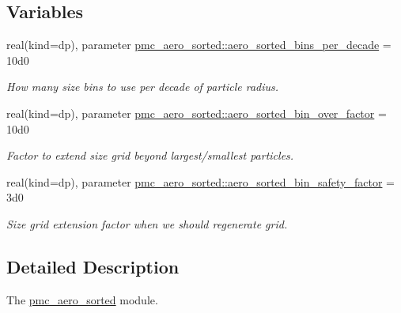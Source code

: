 \subsection*{Variables}
\begin{DoxyCompactItemize}
\item 
real(kind=dp), parameter \mbox{\hyperlink{namespacepmc__aero__sorted_acb40c5cb90b0ff373c45a7558bcca305}{pmc\+\_\+aero\+\_\+sorted\+::aero\+\_\+sorted\+\_\+bins\+\_\+per\+\_\+decade}} = 10d0
\begin{DoxyCompactList}\small\item\em How many size bins to use per decade of particle radius. \end{DoxyCompactList}\item 
real(kind=dp), parameter \mbox{\hyperlink{namespacepmc__aero__sorted_a8d4f2e6bc86816a9514588cfaf6d26b5}{pmc\+\_\+aero\+\_\+sorted\+::aero\+\_\+sorted\+\_\+bin\+\_\+over\+\_\+factor}} = 10d0
\begin{DoxyCompactList}\small\item\em Factor to extend size grid beyond largest/smallest particles. \end{DoxyCompactList}\item 
real(kind=dp), parameter \mbox{\hyperlink{namespacepmc__aero__sorted_add014bc362ca68811406a3fd86b27706}{pmc\+\_\+aero\+\_\+sorted\+::aero\+\_\+sorted\+\_\+bin\+\_\+safety\+\_\+factor}} = 3d0
\begin{DoxyCompactList}\small\item\em Size grid extension factor when we should regenerate grid. \end{DoxyCompactList}\end{DoxyCompactItemize}


\subsection{Detailed Description}
The \mbox{\hyperlink{namespacepmc__aero__sorted}{pmc\+\_\+aero\+\_\+sorted}} module. 

